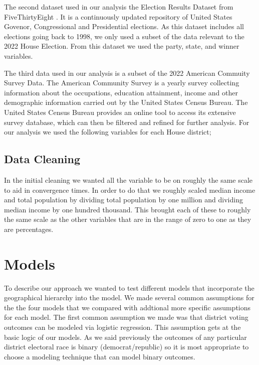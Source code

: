 \documentclass[12pt]{article}
\begin{document}
The second dataset used in our analysis the Election Results Dataset from FiveThirtyEight \cite{electionresultsdataset}. It is a continuously updated repository of United States Govenor, Congressional and Presidential elections. As this dataset includes all elections going back to 1998, we only used a subset of the data relevant to the 2022 House Election. From this dataset we used the party, state, and winner variables. 

The third data used in our analysis is a subset of the 2022 American Commuity Survey Data. The American Community Survey is a yearly survey collecting information about the occupations, education attainment, income and other demographic information carried out by the United States Census Bureau. The United States Census Bureau provides an online tool to access its extensive survey database, which can then be filtered and refined for further analysis. For our analysis we used the following variables for each House district; 



\subsection{Data Cleaning}

In the initial cleaning we wanted all the variable to be on roughly the same scale to aid in convergence times. In order to do that we roughly scaled median income and total population by dividing total population by one million and dividing median income by one hundred thousand. This brought each of these to roughly the same scale as the other variables that are in the range of zero to one as they are percentages. 

\section{Models}

To describe our approach we wanted to test different models that incorporate the geographical hierarchy into the model. We made several common assumptions for the the four models that we compared with addtional more specific assumptions for each model. The first common assumption we made was that district voting outcomes can be modeled via logistic regression. This assumption gets at the basic logic of our models. As we said previously the outcomes of any particular district electoral race is binary (democrat/republic) so it is most appropriate to choose a modeling technique that can model binary outcomes. 
\end{document}
